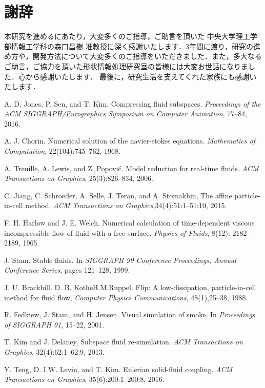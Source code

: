 \documentclass[a4j,12pt]{jreport}
\def\syaji{ \chapter*{謝辞} \addcontentsline{toc}{chapter}{謝辞}}
\begin{document}
\syaji
\par
本研究を進めるにあたり，大変多くのご指導，ご助言を頂いた
中央大学理工学部情報工学科の森口昌樹 准教授に深く感謝いたします．3年間に渡り，研究の進め方や，開発方法について大変多くのご指導をいただきました．また，多大なるご助言，ご協力を頂いた形状情報処理研究室の皆様には大変お世話になりました．心から感謝いたします．
最後に，研究生活を支えてくれた家族にも感謝いたします．
\begin{thebibliography}{99}
A. D. Jones, P. Sen, and T. Kim. Compressing fluid subspaces. \textit{Proceedings of the ACM SIGGRAPH/Eurographics Symposium on Computer Animation}, 77--84, 2016.

A. J. Chorin. Numerical solution of the navier-stokes equations. \textit{Mathematics of Computation}, 22(104):745--762, 1968.

A. Treuille, A. Lewis, and Z. Popovi\'{c}. Model reduction for real-time fluids. \textit{ACM Transactions on Graphics}, 25(3):826--834, 2006.

C. Jiang, C. Schroeder, A. Selle, J. Teran, and A. Stomakhin, The affine particle-in-cell method. \textit{ACM Transactions on Graphics},34(4):51:1--51:10, 2015.

F. H. Harlow and J. E. Welch. Numerical calculation of time-dependent viscous incompressible flow of fluid with a free surface. \textit{Physics of Fluids}, 8(12): 2182--2189, 1965.

J. Stam. Stable fluids. In \textit{SIGGRAPH 99 Conference Proceedings, Annual Conference Series}, pages 121--128, 1999.

J. U. Brackbill. D. B. KotheH.M.Ruppel. Flip: A low-dissipation, particle-in-cell method for fluid flow, \textit{Computer Physics Communications}, 48(1),25--38, 1988.

R. Fedkiew, J. Stam, and H. Jensen. Visual simulation of smoke. In \textit{Proceedings of SIGGRAPH 01}, 15--22, 2001.

T. Kim and J. Delaney. Subspace fluid re-simulation. \textit{ACM Transactions on Graphics}, 32(4):62:1--62:9, 2013.

Y. Teng, D. I.W. Levin, and T. Kim. Eulerian solid-fluid coupling. \textit{ACM Transactions on Graphics}, 35(6):200:1--200:8, 2016.

\end{thebibliography}
\end{document}
